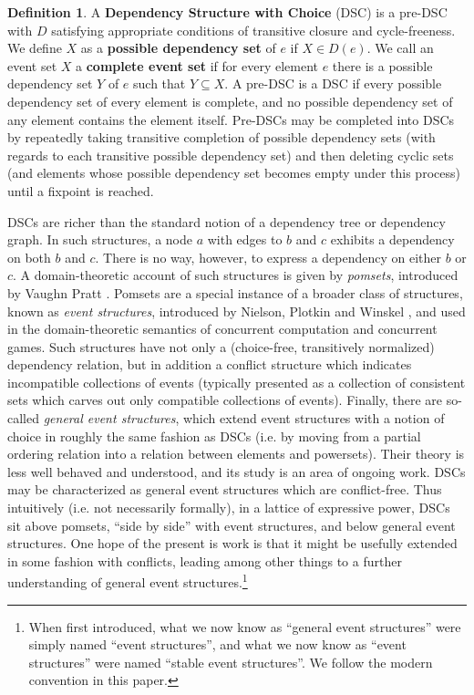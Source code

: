 \documentclass[hoptionsi,review,screen,format=acmsmall]{acmart}
\theoremstyle{definition}
\newtheorem{definition}{Definition}[section]
\begin{document}
\begin{definition}
A \textbf{Dependency Structure with Choice} (DSC) is a pre-DSC with \(D\) satisfying  appropriate conditions of transitive closure and cycle-freeness. We define \(X\) as a \textbf{possible dependency set} of \(e\) if \(X \in D(e)\). We call an event set \(X\) a \textbf{complete event set} if for every element \(e\) there is a possible dependency set \(Y\) of \(e\) such that \(Y \subseteq X\). A pre-DSC is a DSC if every possible dependency set of every element is complete, and no possible dependency set of any element contains the element itself. Pre-DSCs may be completed into DSCs by repeatedly taking transitive completion of possible dependency sets (with regards to each transitive possible dependency set) and then deleting cyclic sets (and elements whose possible dependency set becomes empty under this process) until a fixpoint is reached.
\end{definition}

DSCs are richer than the standard notion of a dependency tree or dependency graph. In such structures, a node \(a\) with edges to \(b\) and \(c\) exhibits a dependency on both \(b\) and \(c\). There is no way, however, to express a dependency on either \(b\) or \(c\). A domain-theoretic account of such structures is given by \textit{pomsets}, introduced by Vaughn Pratt \cite{pratt1986modeling}. Pomsets are a special instance of a broader class of structures, known as \textit{event structures}, introduced by Nielson, Plotkin and Winskel \cite{nielsen1981petri}, and used in the domain-theoretic semantics of concurrent computation and concurrent games. Such structures have not only a (choice-free, transitively normalized) dependency relation, but in addition a conflict structure which indicates incompatible collections of events (typically presented as a collection of consistent sets which carves out only compatible collections of events). Finally, there are so-called \textit{general event structures}, which extend event structures with a notion of choice in roughly the same fashion as DSCs (i.e. by moving from a partial ordering relation into a relation between elements and powersets). Their theory is less well behaved and understood, and its study is an area of ongoing work. DSCs may be characterized as general event structures which are conflict-free. Thus intuitively (i.e. not necessarily formally), in a lattice of expressive power, DSCs sit above pomsets, ``side by side'' with event structures, and below general event structures. One hope of the present is work is that it might be usefully extended in some fashion with conflicts, leading among other things to a further understanding of general event structures.\footnote{When first introduced, what we now know as ``general event structures'' were simply named ``event structures'', and what we now know as ``event structures'' were named ``stable event structures''. We follow the modern convention in this paper.}
\end{document}
